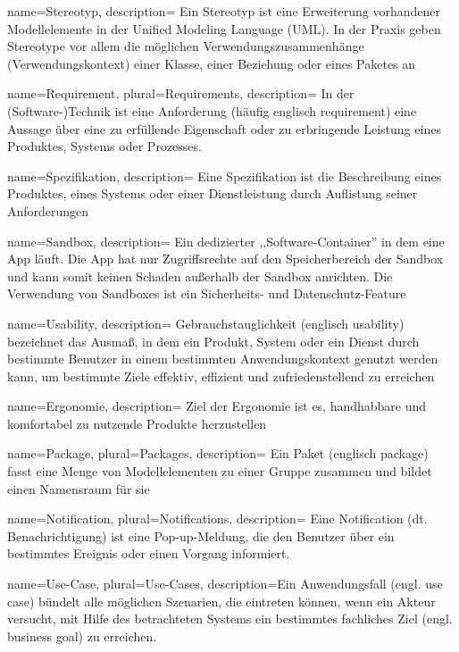 {
  name=Stereotyp,
  description={
    Ein Stereotyp ist eine Erweiterung vorhandener Modellelemente in der Unified Modeling Language (UML). In der Praxis geben Stereotype vor allem die möglichen Verwendungszusammenhänge (Verwendungskontext) einer Klasse, einer Beziehung oder eines Paketes an}
}

 {
name=Requirement,
plural=Requirements,
description={
In der (Software-)Technik ist eine Anforderung (häufig englisch requirement) eine Aussage über eine zu erfüllende Eigenschaft oder zu erbringende Leistung eines Produktes, Systems oder Prozesses.}
}

{
  name=Spezifikation,
  description={
    Eine Spezifikation ist die Beschreibung eines Produktes, eines Systems oder einer Dienstleistung durch Auflistung seiner Anforderungen}
}

{
  name=Sandbox,
  description={
    Ein dedizierter ,,Software-Container'' in dem eine App läuft. Die App hat nur Zugriffsrechte auf den Speicherbereich der Sandbox und kann somit keinen Schaden außerhalb der Sandbox anrichten. Die Verwendung von Sandboxes ist ein Sicherheits- und Datenschutz-Feature}
}

{
name=Usability,
description={
  Gebrauchstauglichkeit (englisch usability) bezeichnet das Ausmaß, in dem ein Produkt, System oder ein Dienst durch bestimmte Benutzer in einem bestimmten Anwendungskontext genutzt werden kann, um bestimmte Ziele effektiv, effizient und zufriedenstellend zu erreichen}
}

 {
name=Ergonomie,
description={
  Ziel der Ergonomie ist es, handhabbare und komfortabel zu nutzende Produkte herzustellen}
}

 {
name=Package,
plural=Packages,
description={
Ein Paket (englisch package) fasst eine Menge von Modellelementen zu einer Gruppe zusammen und bildet einen Namensraum für sie}
}

 {
name=Notification,
plural=Notifications,
description={
Eine Notification (dt. Benachrichtigung) ist eine Pop-up-Meldung, die den Benutzer über ein bestimmtes Ereignis oder einen Vorgang informiert.
}
}

 {
name=Use-Case,
plural=Use-Cases,
description={Ein Anwendungsfall (engl. use case) bündelt alle möglichen Szenarien, die eintreten können, wenn ein Akteur versucht,
mit Hilfe des betrachteten Systems ein bestimmtes fachliches Ziel (engl. business goal) zu erreichen.}
}
